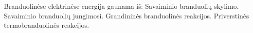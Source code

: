 Branduolinėse elektrinėse energija gaunama iš:
Savaiminio branduolių skylimo.
Savaiminio branduolių jungimosi.
Grandininės branduolinės reakcijos.
Priverstinės termobranduolinės reakcijos.